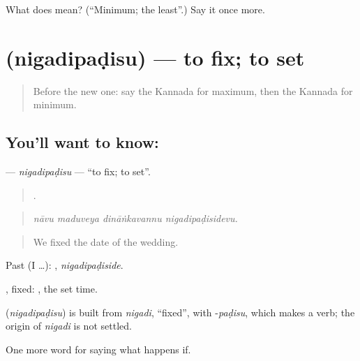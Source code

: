 \begin{tcolorbox}[breakable,colback=teal!4,colframe=teal!35!black,title={Before you move on}]
What does  mean? (\textquotedblleft{}Minimum; the least\textquotedblright{}.) Say it once more.
\end{tcolorbox}
\section[\texorpdfstring{\kn{ನಿಗದಿಪಡಿಸು} (nigadipaḍisu)}{ನಿಗದಿಪಡಿಸು (nigadipaḍisu)}]{ (nigadipaḍisu) — to fix; to set}

\label{lesson:KA-C414-nigadipadisu}



\begin{quote}
Before the new one: say the Kannada for maximum, then the Kannada for minimum.
\end{quote}

\subsection*{You'll want to know: }
\textbf{} — \emph{nigadipaḍisu} — \textquotedblleft{}to fix; to set\textquotedblright{}.

\begin{quote}
   .
\end{quote}

\begin{quote}
\emph{nāvu maduveya dināṅkavannu nigadipaḍisidevu.}
\end{quote}

\begin{quote}
We fixed the date of the wedding.
\end{quote}

Past (I …): , \emph{nigadipaḍiside}.

, fixed:  , the set time.

\begin{cousinweb}
\textbf{} (\emph{nigadipaḍisu}) is built from \emph{nigadi}, \textquotedblleft{}fixed\textquotedblright{}, with -\emph{paḍisu}, which makes a verb; the origin of \emph{nigadi} is not settled.
\end{cousinweb}

\begin{grammarlens}[title={What you've built}]
One more word for saying what happens if.
\end{grammarlens}

